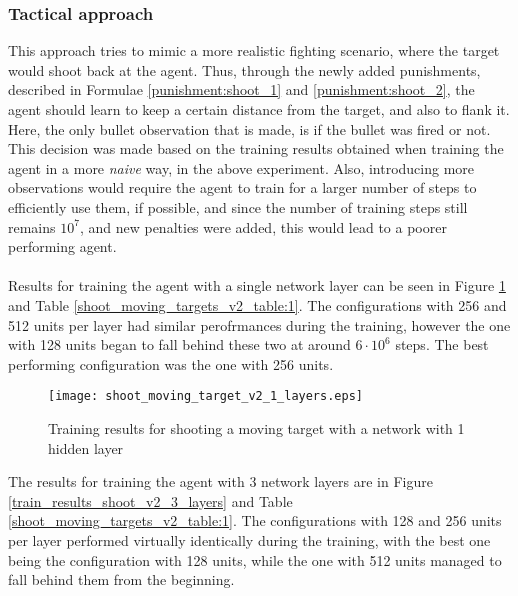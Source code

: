 \subsubsection{Tactical approach} \label{subsubsection:shoot_tactical}

This approach tries to mimic a more realistic fighting scenario, where the target would shoot back at the agent. Thus, through the newly added punishments, described in Formulae \ref{punishment:shoot_1} and \ref{punishment:shoot_2}, the agent should learn to keep a certain distance from the target, and also to flank it. Here, the only bullet observation that is made, is if the bullet was fired or not. This decision was made based on the training results obtained when training the agent in a more \emph{naive} way, in the above experiment. Also, introducing more observations would require the agent to train for a larger number of steps to efficiently use them, if possible, and since the number of training steps still remains $10^7$, and new penalties were added, this would lead to a poorer performing agent. 

\paragraph{}
Results for training the agent with a single network layer can be seen in Figure \ref{train_results_shoot_v2_1_layers} and Table \ref{shoot_moving_targets_v2_table:1}. The configurations with 256 and 512 units per layer had similar perofrmances during the training, however the one with 128 units began to fall behind these two at around $6 \cdot 10^6$ steps. The best performing configuration was the one with 256 units.

\begin{figure}
    \begin{center}
        \texttt{[image: shoot\_moving\_target\_v2\_1\_layers.eps]}
        \caption{Training results for shooting a moving target with a network with 1 hidden layer}
        \label{train_results_shoot_v2_1_layers}
    \end{center}
\end{figure}

The results for training the agent with 3 network layers are in Figure \ref{train_results_shoot_v2_3_layers} and Table \ref{shoot_moving_targets_v2_table:1}. The configurations with 128 and 256 units per layer performed virtually identically during the training, with the best one being the configuration with 128 units, while the one with 512 units managed to fall behind them from the beginning.

